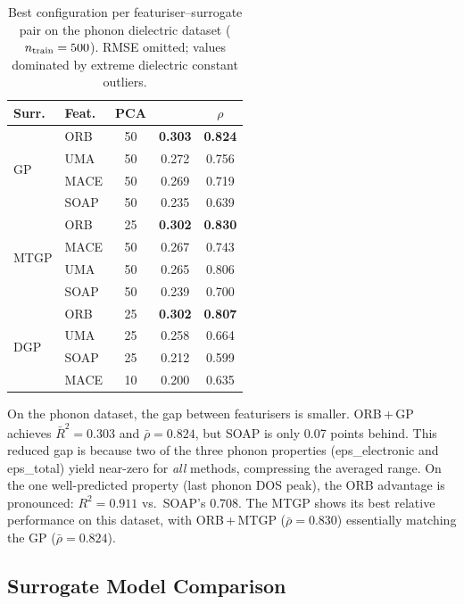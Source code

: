 \begin{table}[H]
    \centering
    \caption{Best configuration per featuriser--surrogate pair on the phonon dielectric dataset ($n_{\text{train}} = 500$). RMSE omitted; values dominated by extreme dielectric constant outliers.}
    \label{tab:best_configs_phonon}
    \footnotesize
    \begin{tabular}{@{}llccc@{}}
        \toprule
        \textbf{Surr.} & \textbf{Feat.} & \textbf{PCA} & \textbf{\Rtwo{}} & \textbf{$\rho$} \\
        \midrule
        \multirow{4}{*}{GP}
        & ORB     & 50 & \textbf{0.303} & \textbf{0.824} \\
        & UMA     & 50 & 0.272 & 0.756 \\
        & MACE    & 50 & 0.269 & 0.719 \\
        & SOAP    & 50 & 0.235 & 0.639 \\
        \midrule
        \multirow{4}{*}{MTGP}
        & ORB     & 25 & \textbf{0.302} & \textbf{0.830} \\
        & MACE    & 50 & 0.267 & 0.743 \\
        & UMA     & 50 & 0.265 & 0.806 \\
        & SOAP    & 50 & 0.239 & 0.700 \\
        \midrule
        \multirow{4}{*}{DGP}
        & ORB     & 25 & \textbf{0.302} & \textbf{0.807} \\
        & UMA     & 25 & 0.258 & 0.664 \\
        & SOAP    & 25 & 0.212 & 0.599 \\
        & MACE    & 10 & 0.200 & 0.635 \\
        \bottomrule
    \end{tabular}
\end{table}

On the phonon dataset, the gap between featurisers is smaller.
ORB\,+\,GP achieves $\bar{R}^2 = 0.303$ and $\bar{\rho} = 0.824$, but SOAP is only 0.07 \Rtwo{} points behind.
This reduced gap is because two of the three phonon properties (eps\_electronic and eps\_total) yield near-zero \Rtwo{} for \emph{all} methods, compressing the averaged \Rtwo{} range.
On the one well-predicted property (last phonon DOS peak), the ORB advantage is pronounced: $R^2 = 0.911$ vs.\ SOAP's 0.708.
The MTGP shows its best relative performance on this dataset, with ORB\,+\,MTGP ($\bar{\rho} = 0.830$) essentially matching the GP ($\bar{\rho} = 0.824$).

\FloatBarrier
\subsection{Surrogate Model Comparison}
\label{sec:surrogate_comparison}

